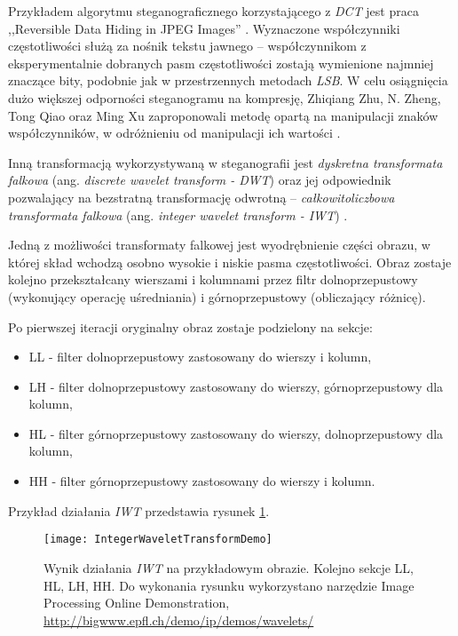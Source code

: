 {{{            %
            Przykładem algorytmu steganograficznego korzystającego z \textit{DCT} jest praca ,,Reversible Data
            Hiding in JPEG Images'' \cite{Huang2016ReversibleDH, Li2007ASM}. Wyznaczone współczynniki częstotliwości
            służą za nośnik tekstu jawnego -- współczynnikom z eksperymentalnie dobranych pasm częstotliwości zostają
            wymienione najmniej znaczące bity, podobnie jak w przestrzennych metodach \textit{LSB}. W celu osiągnięcia
            dużo większej odporności steganogramu na kompresję, Zhiqiang Zhu, N. Zheng, Tong Qiao oraz Ming Xu
            zaproponowali metodę opartą na manipulacji znaków współczynników, w odróżnieniu od manipulacji ich
            wartości \cite{Zhu2019RobustSB}.

            Inną transformacją wykorzystywaną w steganografii jest \textit{dyskretna transformata falkowa} (ang.
            \textit{discrete wavelet transform - DWT}) oraz jej odpowiednik pozwalający na bezstratną transformację
            odwrotną -- \textit{całkowitoliczbowa transformata falkowa} (ang. \textit{integer wavelet transform -
            IWT}) \cite{Xuan2005LosslessDH}.

            Jedną z możliwości transformaty falkowej jest wyodrębnienie części obrazu, w której skład wchodzą osobno
            wysokie i niskie pasma częstotliwości. Obraz zostaje kolejno przekształcany wierszami i kolumnami przez
            filtr dolnoprzepustowy (wykonujący operację uśredniania) i górnoprzepustowy (obliczający różnicę).

            Po pierwszej iteracji oryginalny obraz zostaje podzielony na sekcje:
            \begin{itemize}
                \item LL - filter dolnoprzepustowy zastosowany do wierszy i kolumn,
                \item LH - filter dolnoprzepustowy zastosowany do wierszy, górnoprzepustowy dla kolumn,
                \item HL - filter górnoprzepustowy zastosowany do wierszy, dolnoprzepustowy dla kolumn,
                \item HH - filter górnoprzepustowy zastosowany do wierszy i kolumn.
            \end{itemize}

            Przykład działania \textit{IWT} przedstawia rysunek \ref{fig:iwtdemo}.

            \begin{figure}
                \centering
                \texttt{[image: IntegerWaveletTransformDemo]}
                \caption{Wynik działania \textit{IWT} na przykładowym obrazie. Kolejno sekcje LL, HL, LH, HH. Do wykonania
                    rysunku wykorzystano narzędzie Image Processing Online Demonstration, \url{http://bigwww.epfl.ch/demo/ip/demos/wavelets/}}
                \label{fig:iwtdemo}
            \end{figure}


}}}
